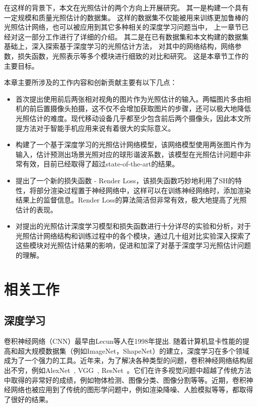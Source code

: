 在这样的背景下，本文在光照估计的两个方向上开展研究。
其一是构建一个具有一定规模和质量光照估计的数据集。
这样的数据集不仅能被用来训练更加鲁棒的光照估计网络，也可以被应用到其它多种相关的深度学习问题当中，
上一章节已经对这一部分工作进行了详细的介绍。
其二是在已有数据集和本文构建的数据集基础上，深入探索基于深度学习的光照估计方法，
对其中的网络结构，网络参数，损失函数，光照表示等多个模块进行细致的对比和研究。
这是本章节工作的主要目标。

本章主要所涉及的工作内容和创新贡献主要有以下几点：
\begin{itemize}
    \item 首次提出使用前后两张相对视角的图片作为光照估计的输入。两幅图片多由相机的前后置摄像头拍摄，这不仅不会增加获取图片的步骤，还可以极大地降低光照估计的难度。现代移动设备几乎都至少包含前后两个摄像头，因此本文所提方法对于智能手机应用来说有着很大的实际意义。
    \item 构建了一个基于深度学习的光照估计网络模型，该网络模型使用两张图片作为输入，估计预测出场景光照对应的球形谐波系数，该模型在光照估计问题中非常有效，目前已经取得了超过state-of-the-art的结果。
    \item 提出了一个新的损失函数 - Render Loss，该损失函数巧妙地利用了SH的特性，将部分渲染过程置于神经网络中，这样可以在训练神经网络时，添加渲染结果上的监督信息。Render Loss的算法简洁但非常有效，极大地提高了光照估计的表现。
    \item 对提出的光照估计深度学习模型和损失函数进行十分详尽的实验和分析，对于光照估计网络结构和训练过程中的各个模块，通过几十组对比实验深入探索了这些模块对光照估计结果的影响，促进和加深了对基于深度学习光照估计问题的理解。
\end{itemize}

\section{相关工作}
\subsection{深度学习}
卷积神经网络（CNN）最早由Lecun等人\cite{lecun1998gradient}在1998年提出. 随着计算机显卡性能的提高和超大规模数据集（例如ImageNet\cite{deng2009imagenet}，ShapeNet\cite{chang2015shapenet}）的建立，深度学习在多个领域成为了一个强力的工具。近年来，为了解决各种类型的问题，卷积神经网络结构层出不穷，例如AlexNet~\cite{krizhevsky2012imagenet}, VGG~\cite{simonyan2014very}, ResNet~\cite{he2016deep}。它们在许多视觉问题中超越了传统方法中取得的非常好的成绩，例如物体检测\cite{girshick2014rich}、图像分类\cite{krizhevsky2012imagenet}、图像分割\cite{ronneberger2015u}等等。近期，卷积神经网络也被应用到了传统的图形学问题中，例如渲染降噪\cite{chaitanya2017interactive}、人脸模拟\cite{karras2017audio}等等，都取得了很好的结果。
